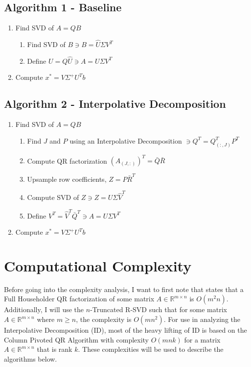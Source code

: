\documentclass{article}[11pt]
\begin{document}
   \subsection{Algorithm 1 - Baseline}
   \begin{enumerate}
   \item Find SVD of $A = QB$
   		\begin{enumerate}
   		\item Find SVD of $B \ni B = \hat{U}\Sigma V^T$
   		\item Define $U = Q\hat{U} \ni A = U \Sigma V^T$ 
   		\end{enumerate}
   \item Compute $x^* = V \Sigma^{+} U^T b$
   \end{enumerate}
   
   \subsection{Algorithm 2 - Interpolative Decomposition}
   \begin{enumerate}
   \item Find SVD of $A = QB$
   		\begin{enumerate}
   		\item Find $J$ and $P$ using an Interpolative Decomposition $\ni Q^{T} = Q^{T}_{(:,J)}P^T$
   		\item Compute QR factorization $(A_{(J,:)})^T = \bar{Q}\bar{R}$
   		\item Upsample row coefficients, $Z = P\bar{R}^T$
   		\item Compute SVD of $Z \ni Z = U \Sigma \hat{V}^T$
   		\item Define $V^T = \hat{V}^T \bar{Q}^T \ni A = U \Sigma V^T$
   		\end{enumerate}
   \item Compute $x^* = V \Sigma^{+} U^T b$
   \end{enumerate}
   
   \newpage
   \section{Computational Complexity}
   Before going into the complexity analysis, I want to first note that \cite{labook} states that a Full Householder QR factorization of some matrix $A \in \mathbb{R}^{m \times n}$ is $O(m^2n)$. Additionally, I will use the $n$-Truncated R-SVD such that for some matrix $A \in \mathbb{R}^{m \times n}$ where $m \geq n$, the complexity is $O(mn^2)$. For use in analyzing the Interpolative Decomposition (ID), most of the heavy lifting of ID is based on the Column Pivoted QR Algorithm with complexity $O(mnk)$ for a matrix $A \in \mathbb{R}^{m \times n}$ that is rank $k$. These complexities will be used to describe the algorithms below.
   
\end{document}
